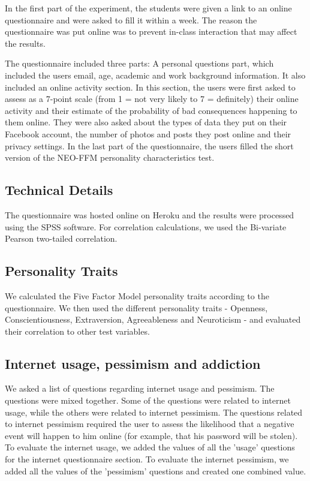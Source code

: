 \documentclass{sig-alternate}
\begin{document}
In the first part of the experiment, the students were given a link to an online questionnaire and were asked to fill it within a week. The reason the questionnaire was put online was to prevent in-class interaction that may affect the results.

The questionnaire included three parts: A personal questions part, which included the users email, age, academic and work background information. It also included an online activity section. In this section, the users were first asked 
to assess as a 7-point scale (from 1 = not very likely to 7 = definitely) 
their online activity
and their estimate of the probability of bad consequences happening 
to them
online. They were also asked about the types of data they put on their Facebook account, the number of photos and posts they post online and their privacy settings. In the last part of the questionnaire, the users filled the short version of the NEO-FFM personality characteristics test. 


\subsection{Technical Details}
The questionnaire was hosted online on Heroku and the results were processed using the SPSS software. For correlation calculations, we used the Bi-variate Pearson two-tailed correlation.









\subsection{Personality Traits}
We calculated the Five Factor Model personality traits according to the questionnaire. We then used the different personality traits - Openness, Conscientiousness, Extraversion, Agreeableness and Neuroticism - and evaluated their correlation to other test variables.



\subsection{Internet usage, pessimism and addiction}
We asked a list of questions regarding internet usage and pessimism. The questions were mixed together. Some of the questions were related to internet usage, while the others were related to internet pessimism. The questions related to internet pessimism required the user to assess the likelihood that a negative event will happen to him online (for example, that his password will be stolen).
To evaluate the internet usage, we added the values of all the 'usage' questions for the internet questionnaire section. To evaluate the internet pessimism, we added all the values of the 'pessimism' questions and created one combined value.
\end{document}
